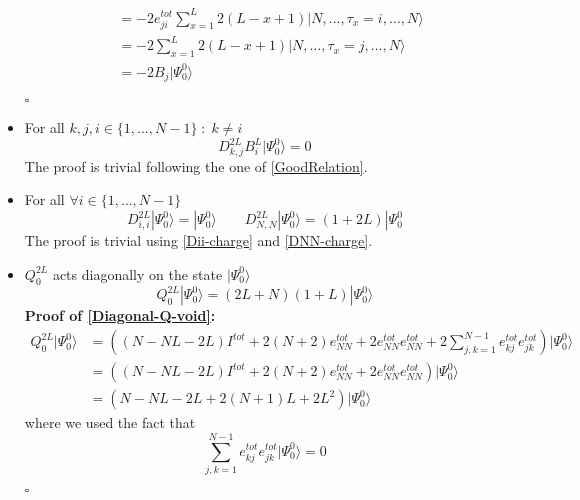 \documentclass[10pt]{article}
\numberwithin{equation}{section}
\numberwithin{equation}{subsection}
\begin{document}
\begin{itemize}
\begin{align}
	\\&=
	-2e_{ji}^{tot}\sum_{x=1}^{L}2(L-x+1)|N,\ldots,\tau_{x}=i,\ldots,N\rangle\nonumber
	\\&=
	-2\sum_{x=1}^{L}2(L-x+1)|N,\ldots,\tau_{x}=j,\ldots,N\rangle\nonumber
	\\&=
	-2B_{j}|\Psi_{0}^{0}\rangle
\end{align}
\begin{flushright}
	$\square$
\end{flushright}
\item For all $k,j,i\in\{1,\ldots,N-1\}\;:\;k\neq i$
\begin{equation}\label{DijBk-different}
	D_{k,j}^{2L}B_{i}^{L}|\Psi_{0}^{0}\rangle=0
\end{equation}
The proof is trivial following the one of \eqref{GoodRelation}. 
\item For all $ \forall i\in \{1,\ldots,N-1\}$
\begin{equation}\label{Dii-ref}
	D_{i,i}^{2L}|\Psi_{0}^{0}\rangle=|\Psi_{0}^{0}\rangle\qquad D_{N,N}^{2L}|\Psi_{0}^{0}\rangle=(1+2L)|\Psi_{0}^{0}
\end{equation}
The proof is trivial using \eqref{Dii-charge} and \eqref{DNN-charge}. 
\item $Q_{0}^{2L}$ acts diagonally on the state $|\Psi_{0}^{0}\rangle$
\begin{equation}\label{Diagonal-Q-void}
	Q_{0}^{2L}|\Psi_{0}^{0}\rangle=(2L+N)(1+L)|\Psi_{0}^{0}\rangle
\end{equation}
\textbf{Proof of \eqref{Diagonal-Q-void}:}
\begin{align}
	Q_{0}^{2L}|\Psi_{0}^{0}\rangle&=\left((N-NL-2L)I^{tot}+2(N+2)e_{NN}^{tot}+2e_{NN}^{tot}e_{NN}^{tot}+2\sum_{j,k=1}^{N-1}e_{kj}^{tot}e_{jk}^{tot}\right)|\Psi_{0}^{0}\rangle\nonumber\\&=
	\left((N-NL-2L)I^{tot}+2(N+2)e_{NN}^{tot}+2e_{NN}^{tot}e_{NN}^{tot}\right)|\Psi_{0}^{0}\rangle\nonumber
	\\&=
	(N-NL-2L+2(N+1)L+2L^{2})|\Psi_{0}^{0}\rangle
\end{align}
where we used the fact that 
\begin{equation}
	\sum_{j,k=1}^{N-1}e_{kj}^{tot}e_{jk}^{tot}|\Psi_{0}^{0}\rangle=0
\end{equation}
\begin{flushright}
	$\square$
\end{flushright}
\end{itemize}
\end{document}
